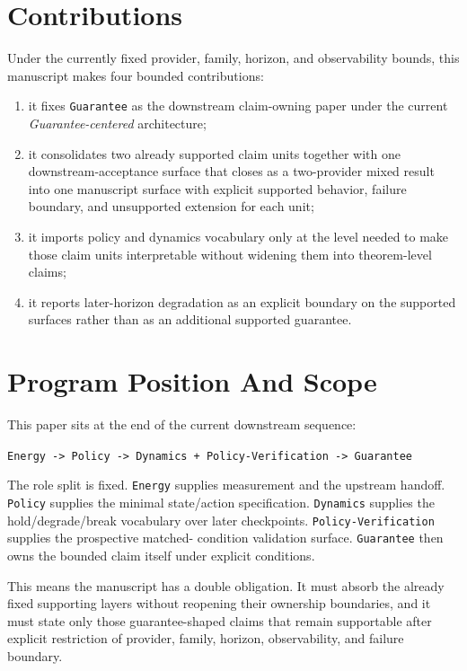 \documentclass[11pt]{article}
\begin{document}
\section{Contributions}

Under the currently fixed provider, family, horizon, and observability bounds,
this manuscript makes four bounded contributions:

\begin{enumerate}
\item it fixes \texttt{Guarantee} as the downstream claim-owning paper under the
current \textit{Guarantee-centered} architecture;
\item it consolidates two already supported claim units together with one
downstream-acceptance surface that closes as a two-provider mixed result into
one manuscript
surface with explicit supported behavior, failure boundary, and unsupported
extension for each unit;
\item it imports policy and dynamics vocabulary only at the level needed to make
those claim units interpretable without widening them into theorem-level claims;
\item it reports later-horizon degradation as an explicit boundary on the
supported surfaces rather than as an additional supported guarantee.
\end{enumerate}

\section{Program Position And Scope}

This paper sits at the end of the current downstream sequence:

\begin{center}
\texttt{Energy -> Policy -> Dynamics + Policy-Verification -> Guarantee}
\end{center}

\noindent The role split is fixed. \texttt{Energy} supplies measurement and the
upstream handoff. \texttt{Policy} supplies the minimal state/action
specification. \texttt{Dynamics} supplies the hold/degrade/break vocabulary over
later checkpoints. \texttt{Policy-Verification} supplies the prospective matched-
condition validation surface. \texttt{Guarantee} then owns the bounded claim
itself under explicit conditions.

This means the manuscript has a double obligation. It must absorb the already
fixed supporting layers without reopening their ownership boundaries, and it must
state only those guarantee-shaped claims that remain supportable after explicit
restriction of provider, family, horizon, observability, and failure boundary.
\end{document}
